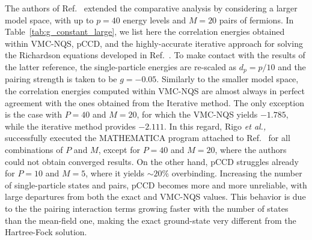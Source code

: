 The authors of Ref.~\cite{rigo2023}  extended the comparative analysis by considering a larger model
space, with up to $p=40$ energy levels and $M=20$ pairs of
fermions. In Table~\ref{tab:g_constant_large}, we list here  the
correlation energies obtained within VMC-NQS, pCCD, and the
highly-accurate iterative approach for solving the Richardson
equations developed in Ref.~\cite{Guan:2022CoPhC}. To make contact
with the results of the latter reference, the single-particle energies
are re-scaled as $d_p = p / 10$ and the pairing strength is taken to
be $g=-0.05$. Similarly to the smaller model space, the correlation
energies computed within VMC-NQS are almost always in perfect
agreement with the ones obtained from the Iterative method. The only
exception is the case with $P=40$ and $M=20$, for which the VMC-NQS
yields $-1.785$, while the iterative method provides $-2.111$. In this
regard, Rigo {\em et al.,} \cite{rigo2023}  successfully executed the MATHEMATICA program attached to
Ref.~\cite{Guan:2022CoPhC} for all combinations of $P$ and $M$, except
for $P=40$ and $M=20$, where the authors  could not obtain converged results. On
the other hand, pCCD struggles already for $P=10$ and $M=5$, where it
yields $\sim 20\%$ overbinding. Increasing the number of
single-particle states and pairs, pCCD becomes more and more
unreliable, with large departures from both the exact and VMC-NQS
values. This behavior is due to the the pairing interaction terms
growing faster with the number of states than the mean-field one,
making the exact ground-state very different from the Hartree-Fock
solution.

